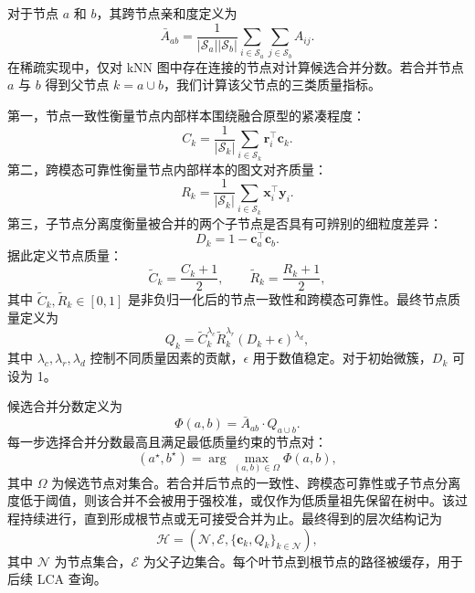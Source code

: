 对于节点 $a$ 和 $b$，其跨节点亲和度定义为
\begin{equation}
    \bar{A}_{ab}
    =
    \frac{1}{|\mathcal{S}_a||\mathcal{S}_b|}
    \sum_{i\in\mathcal{S}_a}
    \sum_{j\in\mathcal{S}_b}
    A_{ij}.
\end{equation}
在稀疏实现中，仅对 kNN 图中存在连接的节点对计算候选合并分数。若合并节点 $a$ 与 $b$ 得到父节点 $k=a\cup b$，我们计算该父节点的三类质量指标。

第一，节点一致性衡量节点内部样本围绕融合原型的紧凑程度：
\begin{equation}
    C_k
    =
    \frac{1}{|\mathcal{S}_k|}
    \sum_{i\in\mathcal{S}_k}
    \boldsymbol{r}_i^{\top}\boldsymbol{c}_k .
\end{equation}
第二，跨模态可靠性衡量节点内部样本的图文对齐质量：
\begin{equation}
    R_k
    =
    \frac{1}{|\mathcal{S}_k|}
    \sum_{i\in\mathcal{S}_k}
    \boldsymbol{x}_i^{\top}\boldsymbol{y}_i .
\end{equation}
第三，子节点分离度衡量被合并的两个子节点是否具有可辨别的细粒度差异：
\begin{equation}
    D_k
    =
    1-\boldsymbol{c}_a^{\top}\boldsymbol{c}_b .
\end{equation}
据此定义节点质量：
\begin{equation}
    \tilde{C}_k=\frac{C_k+1}{2},
    \qquad
    \tilde{R}_k=\frac{R_k+1}{2},
\end{equation}
其中 $\tilde{C}_k,\tilde{R}_k\in[0,1]$ 是非负归一化后的节点一致性和跨模态可靠性。最终节点质量定义为
\begin{equation}
    Q_k
    =
    \tilde{C}_k^{\lambda_c}
    \tilde{R}_k^{\lambda_r}
    \left(D_k+\epsilon\right)^{\lambda_d},
\end{equation}
其中 $\lambda_c,\lambda_r,\lambda_d$ 控制不同质量因素的贡献，$\epsilon$ 用于数值稳定。对于初始微簇，$D_k$ 可设为 1。

候选合并分数定义为
\begin{equation}
    \Phi(a,b)
    =
    \bar{A}_{ab}
    \cdot
    Q_{a\cup b}.
\end{equation}
每一步选择合并分数最高且满足最低质量约束的节点对：
\begin{equation}
    (a^\star,b^\star)
    =
    \arg\max_{(a,b)\in\Omega}
    \Phi(a,b),
\end{equation}
其中 $\Omega$ 为候选节点对集合。若合并后节点的一致性、跨模态可靠性或子节点分离度低于阈值，则该合并不会被用于强校准，或仅作为低质量祖先保留在树中。该过程持续进行，直到形成根节点或无可接受合并为止。最终得到的层次结构记为
\begin{equation}
    \mathcal{H}=(\mathcal{N},\mathcal{E},\{\boldsymbol{c}_k,Q_k\}_{k\in\mathcal{N}}),
\end{equation}
其中 $\mathcal{N}$ 为节点集合，$\mathcal{E}$ 为父子边集合。每个叶节点到根节点的路径被缓存，用于后续 LCA 查询。

